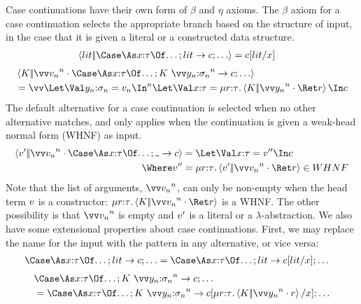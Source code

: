 \documentclass{article}
\begin{document}
Case continuations have their own form of $\beta$ and $\eta$ axioms.  The
$\beta$ axiom for a case continuation selects the appropriate branch based on
the structure of input, in the case that it is given a literal or a constructed
data structure.
\begin{align*}
  \cut{\lit}{\caseas{\ann{x}{\ty}}{\dots;\alt{\lit}{\cmd};\dots}}
  &=
  \cmd\subst{x}{\lit}
\end{align*}
\begin{align*}
  &
  \cut
  {K}
  {\app
    {\vect[n]{\tm_n}}
    {\caseas{\ann{x}{\ty}}{
      \dots;\alt{K ~ \vect[n]{\ann{y_n}{\sty_n}}}{\cmd};\dots}}}
  \\
  &=
  \vect[n]{
  \Let
    \nonrec{\bindv{\ann{y_n}{\sty_n}}{\tm_n}}
  \In
  }
  \Let \nonrec{
    \bindv
    {\ann{x}{\ty}}
    {\comp{\ann{r}{\ty}}\cut{K}{\app{\vect[n]{y_n}}{\ret r}}}
  } \In
    \cmd
\end{align*}
The default alternative for a case continuation is selected when no other
alternative matches, and only applies when the continuation is given a weak-head
normal form (WHNF) as input.
\begin{align*}
  \cut{\tm'}{\app{\vect[n]{\tm_n}}{\caseas{\ann{x}{\ty}}{\dots;\alt{\blank}{\cmd}}}}
  &=
  \Let
    \nonrec{\bindv{\ann{x}{\ty}}{\tm''}}
  \In
    \cmd
  \\
  \Where
  \tm''
  &=
  \comp{\ann{r}{\ty}}\cut{\tm'}{\app{\vect[n]{\tm_n}}{\ret r}}
  \in
  WHNF
\end{align*}
Note that the list of arguments, $\vect[n]{\tm_n}$, can only be non-empty when
the head term $v$ is a constructor:
$\comp{\ann{r}{\ty}}\cut{K}{\app{\vect[n]{\tm_n}}{\ret r}}$ is a WHNF.  The
other possibility is that $\vect[n]{\tm_n}$ is empty and $v'$ is a literal or
a $\lambda$-abstraction.  We also have some extensional properties about case
continuations.  First, we may replace the name for the input with the pattern in
any alternative, or vice versa:
\begin{align*}
  \caseas{\ann{x}{\ty}}{\dots;\alt{\lit}{\cmd};\dots}
  &=
  \caseas{\ann{x}{\ty}}{\dots;\alt{\lit}{\cmd\subst{x}{\lit}};\dots}
\end{align*}
\begin{align*}
  &
  \caseas{\ann{x}{\ty}}{\dots;\alt{K ~ \vect[n]{\ann{y_n}{\sty_n}}}{\cmd};\dots}
  \\
  &=
  \caseas{\ann{x}{\ty}}{
    \dots;
    \alt
    {K ~ \vect[n]{\ann{y_n}{\sty_n}}}
    {\cmd\subst{x}{\comp{\ann{r}{\ty}}\cut{K}{\app{\vect[n]{y_n}}{r}}}};
    \dots
    }
\end{align*}
\end{document}
